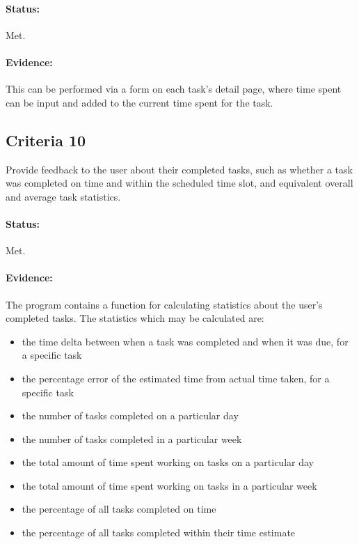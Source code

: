 \documentclass{article}
\begin{document}
\paragraph{Status:}
Met.

\paragraph{Evidence:}
This can be performed via a form on each task's detail page,
where time spent can be input and added to the current time spent for the task.

\subsection{Criteria 10}
Provide feedback to the user about their completed tasks,
such as whether a task was completed on time and within the scheduled time slot,
and equivalent overall and average task statistics.

\paragraph{Status:}
Met.

\paragraph{Evidence:}
The program contains a function for calculating statistics about the user's completed tasks.
The statistics which may be calculated are:
\begin{itemize}
	\item the time delta between when a task was completed and when it was due,
	      for a specific task
	\item the percentage error of the estimated time from actual time taken,
	      for a specific task
	\item the number of tasks completed on a particular day
	\item the number of tasks completed in a particular week
	\item the total amount of time spent working on tasks on a particular day
	\item the total amount of time spent working on tasks in a particular week
	\item the percentage of all tasks completed on time
	\item the percentage of all tasks completed within their time estimate
\end{itemize}
\end{document}
